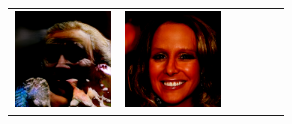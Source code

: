 \documentclass{article}
\newcommand{\pganw}{1.0in}
\begin{document}
\begin{table}[htbp]
\begin{center}
\begin{tabular}{cc|cc|cc}
\includegraphics[width=\pganw]{figures/pgan/8_base_raw_base.png} &
\includegraphics[width=\pganw]{figures/pgan/9_base_raw_base.png} &

\end{tabular}
\end{center}
\end{table}
\end{document}
